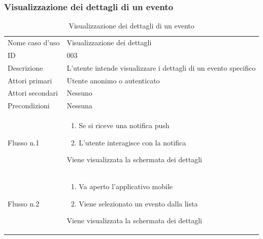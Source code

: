 \documentclass{article}
\begin{document}
\subsubsection{Visualizzazione dei dettagli di un evento}

\begin{table}[htbp]
    \label{tab:tabella_use_case003}
    \centering
    \begin{tabularx}{\textwidth}{| l | X |}
        \Xhline{2pt} %
        Nome caso d'uso & Visualizzazione dei dettagli \\
        \Xhline{2pt} %
        ID & 003 \\
        \hline
        Descrizione & L'utente intende visualizzare i dettagli di un evento specifico\\
        \hline
        Attori primari & Utente anonimo o autenticato\\
        \hline
        Attori secondari & Nessuno \\
        \hline
        Precondizioni & Nessuna \\
        \hline
        Flusso n.1 & 
        \begin{enumerate}[topsep=5pt,partopsep=0pt,parsep=0pt,itemsep=0pt,before=\vspace{-\baselineskip},after=\vspace{-\baselineskip}]                
            \item Se si riceve una notifica push
            \item L'utente interagisce con la notifica
        \end{enumerate}
        \vspace{5pt}
        Viene visualizzata la schermata dei dettagli
        \\
        \hline
        Flusso n.2 & 
        \begin{enumerate}[topsep=5pt,partopsep=0pt,parsep=0pt,itemsep=0pt,before=\vspace{-\baselineskip},after=\vspace{-\baselineskip}]                
            \item Va aperto l'applicativo mobile
            \item Viene selezionato un evento dalla lista
        \end{enumerate}
        \vspace{5pt}
        Viene visualizzata la schermata dei dettagli
        \\
        \hline
    \end{tabularx}
    \caption{Visualizzazione dei dettagli di un evento}
\end{table}
\end{document}
